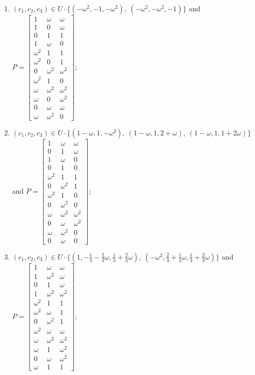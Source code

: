 \begin{enumerate}
\item[(f50)\,\newitem] $(c_1,c_2,c_3)\in U\cdot\{(-\omega^2,-1,-\omega^2),\allowbreak\ (-\omega^2,-\omega^2,-1)\}$ and $P=\begin{bmatrix}1&\omega&\omega\\1&0&\omega\\0&1&1\\1&\omega&0\\\omega^2&1&1\\\omega^2&0&1\\0&\omega^2&\omega^2\\\omega^2&1&0\\\omega&\omega^2&\omega^2\\\omega&0&\omega^2\\0&\omega&\omega\\\omega&\omega^2&0\end{bmatrix}$;
\item[(f51)\,\newitem] $(c_1,c_2,c_3)\in U\cdot\{(1-\omega,1,-\omega^2),\allowbreak\ (1-\omega,1,2+\omega),\allowbreak\ (1-\omega,1,1+2\omega)\}$ and $P=\begin{bmatrix}1&\omega&\omega\\0&1&\omega\\1&\omega&0\\0&1&0\\\omega^2&1&1\\0&\omega^2&1\\\omega^2&1&0\\0&\omega^2&0\\\omega&\omega^2&\omega^2\\0&\omega&\omega^2\\\omega&\omega^2&0\\0&\omega&0\end{bmatrix}$;
\item[(f52)\,\newitem] $(c_1,c_2,c_3)\in U\cdot\{(1,-\tfrac{1}{3}-\tfrac{2}{3}\omega,\tfrac{1}{3}+\tfrac{2}{3}\omega),\allowbreak\ (-\omega^2,\tfrac{2}{3}+\tfrac{1}{3}\omega,\tfrac{1}{3}+\tfrac{2}{3}\omega)\}$ and $P=\begin{bmatrix}1&\omega&\omega\\1&\omega^2&\omega\\0&1&\omega\\1&\omega^2&\omega^2\\\omega^2&1&1\\\omega^2&\omega&1\\0&\omega^2&1\\\omega^2&\omega&\omega\\\omega&\omega^2&\omega^2\\\omega&1&\omega^2\\0&\omega&\omega^2\\\omega&1&1\end{bmatrix}$;

\end{enumerate}
